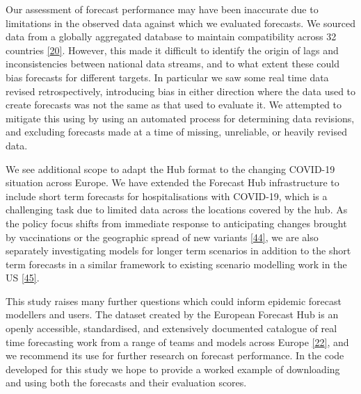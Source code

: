 \documentclass[
]{article}
\begin{document}
Our assessment of forecast performance may have been inaccurate due to
limitations in the observed data against which we evaluated forecasts.
We sourced data from a globally aggregated database to maintain
compatibility across 32 countries
\protect\hyperlink{ref-dongInteractiveWebbasedDashboard2020}{{[}20{]}}.
However, this made it difficult to identify the origin of lags and
inconsistencies between national data streams, and to what extent these
could bias forecasts for different targets. In particular we saw some
real time data revised retrospectively, introducing bias in either
direction where the data used to create forecasts was not the same as
that used to evaluate it. We attempted to mitigate this using by using
an automated process for determining data revisions, and excluding
forecasts made at a time of missing, unreliable, or heavily revised
data.

We see additional scope to adapt the Hub format to the changing COVID-19
situation across Europe. We have extended the Forecast Hub
infrastructure to include short term forecasts for hospitalisations with
COVID-19, which is a challenging task due to limited data across the
locations covered by the hub. As the policy focus shifts from immediate
response to anticipating changes brought by vaccinations or the
geographic spread of new variants
\protect\hyperlink{ref-europeancentrefordiseasepreventionandcontrolOverviewImplementationCOVID192021}{{[}44{]}},
we are also separately investigating models for longer term scenarios in
addition to the short term forecasts in a similar framework to existing
scenario modelling work in the US
\protect\hyperlink{ref-borcheringModelingFutureCOVID192021}{{[}45{]}}.

This study raises many further questions which could inform epidemic
forecast modellers and users. The dataset created by the European
Forecast Hub is an openly accessible, standardised, and extensively
documented catalogue of real time forecasting work from a range of teams
and models across Europe
\protect\hyperlink{ref-europeancovid-19forecasthubEuropeanCovid19Forecast}{{[}22{]}},
and we recommend its use for further research on forecast performance.
In the code developed for this study we hope to provide a worked example
of downloading and using both the forecasts and their evaluation scores.
\end{document}
